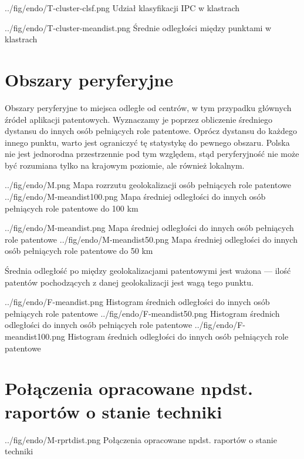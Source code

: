 \tblside
  {../fig/endo/T-cluster-clsf.png}
    {Udział klasyfikacji \ac{IPC} w klastrach}

\tblside
  {../fig/endo/T-cluster-meandist.png}
    {Średnie odległości między punktami w klastrach}



\newpage
\section{Obszary peryferyjne}

Obszary peryferyjne to miejsca odległe od centrów, w tym przypadku
głównych źródeł aplikacji patentowych. Wyznaczamy je poprzez obliczenie
średniego dystansu do innych osób pełniących role patentowe.
Oprócz dystansu do każdego innego punktu, warto jest ograniczyć
tę statystykę do pewnego obszaru. Polska nie jest jednorodna przestrzennie 
pod tym względem, stąd peryferyjność nie może być rozumiana tylko 
na krajowym poziomie, ale również lokalnym.

\figsides
  {../fig/endo/M.png}
    {Mapa rozrzutu geolokalizacji osób pełniących role patentowe}
  {../fig/endo/M-meandist100.png}
    {Mapa średniej odległości do innych osób pełniących role patentowe do 100 km}

\figsides
  {../fig/endo/M-meandist.png}
    {Mapa średniej odległości do innych osób pełniących role patentowe}
  {../fig/endo/M-meandist50.png}
    {Mapa średniej odległości do innych osób pełniących role patentowe do 50 km}

\newpage
{}
{
  \begin{uwaga}
  Średnia odległość po między geolokalizacjami patentowymi jest ważona ---
  ilość patentów pochodzących z danej geolokalizacji jest wagą tego punktu.
  \end{uwaga}
}

\figsidesTri
  {../fig/endo/F-meandist.png}
    {Histogram średnich odległości do innych osób pełniących role patentowe}
  {../fig/endo/F-meandist50.png}
    {Histogram średnich odległości do innych osób pełniących role patentowe}
  {../fig/endo/F-meandist100.png}
    {Histogram średnich odległości do innych osób pełniących role patentowe}



\newpage

\section{Połączenia opracowane npdst. raportów o stanie techniki}

  {../fig/endo/M-rprtdist.png}
    {Połączenia opracowane npdst. raportów o stanie techniki}

